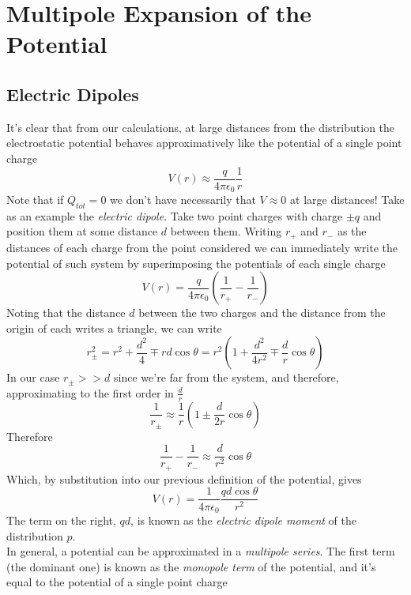 \documentclass[../electromagnetism]{subfiles}
\begin{document}
\section{Multipole Expansion of the Potential}
\subsection{Electric Dipoles}
It's clear that from our calculations, at large distances from the distribution the electrostatic potential behaves approximatively like the potential of a single point charge
\begin{equation*}
	V(r)\approx \frac{q}{4\pi\epsilon_0}\frac{1}{r}
\end{equation*}
Note that if $Q_{tot}=0$ we don't have necessarily that $V\approx0$ at large distances! Take as an example the \textit{electric dipole}. Take two point charges with charge $\pm q$ and position them at some distance $d$ between them. Writing $r_+$ and $r_-$ as the distances of each charge from the point considered we can immediately write the potential of such system by superimposing the potentials of each single charge
\begin{equation*}
	V(r)=\frac{q}{4\pi\epsilon_0}\left( \frac{1}{r_+}-\frac{1}{r_-} \right)
\end{equation*}
Noting that the distance $d$ between the two charges and the distance from the origin of each writes a triangle, we can write
\begin{equation*}
	r^2_{\pm}=r^2+\frac{d^2}{4}\mp rd\cos\theta=r^2\left( 1+\frac{d^2}{4r^2}\mp\frac{d}{r}\cos\theta \right)
\end{equation*}
In our case $r_{\pm}>>d$ since we're far from the system, and therefore, approximating to the first order in $\frac{d}{r}$
\begin{equation*}
	\frac{1}{r_{\pm}}\approx\frac{1}{r}\left( 1\pm\frac{d}{2r}\cos\theta \right)
\end{equation*}
Therefore
\begin{equation*}
	\frac{1}{r_+}-\frac{1}{r_-}\approx\frac{d}{r^2}\cos\theta
\end{equation*}
Which, by substitution into our previous definition of the potential, gives
\begin{equation}
	V(r)=\frac{1}{4\pi\epsilon_0}\frac{qd\cos\theta}{r^2}
	\label{eq:dippot}
\end{equation}
The term on the right, $qd$, is known as the \textit{electric dipole moment} of the distribution $p$.\\
In general, a potential can be approximated in a \textit{multipole series}. The first term (the dominant one) is known as the \textit{monopole term} of the potential, and it's equal to the potential of a single point charge
\end{document}
